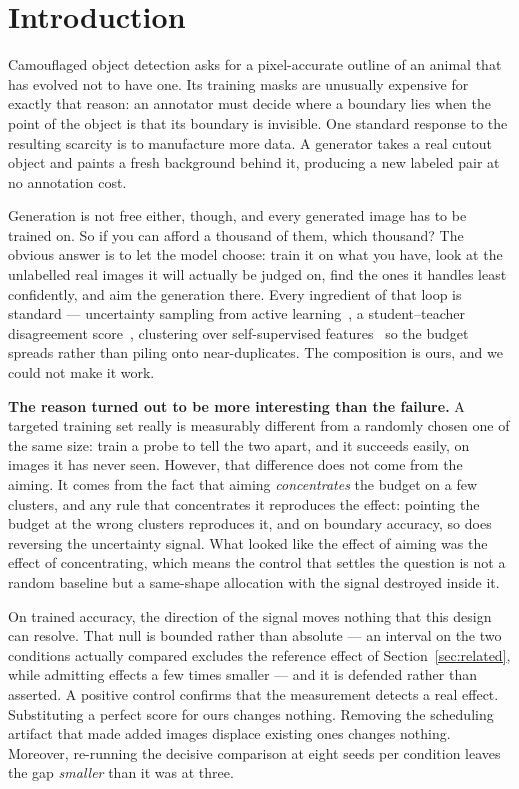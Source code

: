 \documentclass{article}
\begin{document}
\section{Introduction}
\label{sec:intro}
Camouflaged object detection asks for a pixel-accurate outline of an animal that has evolved not to
have one. Its training masks are unusually expensive for exactly that reason: an annotator must
decide where a boundary lies when the point of the object is that its boundary is invisible. One standard response to the resulting scarcity is to manufacture more data. A generator takes a real
cutout object and paints a fresh background behind it, producing a new labeled pair at no
annotation cost.

Generation is not free either, though, and every generated image has to be trained on. So if you can
afford a thousand of them, which thousand? The obvious answer is to let the model choose: train it
on what you have, look at the unlabelled real images it will actually be judged on, find the ones it
handles least confidently, and aim the generation there. Every ingredient of that loop is
standard --- uncertainty sampling from active learning~\citep{settles2009active}, a student--teacher
disagreement score~\citep{tarvainen2017mean}, clustering over self-supervised
features~\citep{oquab2024dinov2} so the budget spreads rather than piling onto near-duplicates. The
composition is ours, and we could not make it work.

\textbf{The reason turned out to be more interesting than the failure.} A targeted training set
really is measurably different from a randomly chosen one of the same size: train a probe to tell the two apart, and it succeeds easily, on images it has never seen. However, that difference does not come
from the aiming. It comes from the fact that aiming \emph{concentrates} the budget on a few
clusters, and any rule that concentrates it reproduces the effect: pointing the budget at the wrong
clusters reproduces it, and on boundary accuracy, so does reversing the uncertainty signal. What
looked like the effect of aiming was the effect of concentrating, which means the control that
settles the question is not a random baseline but a same-shape allocation with the signal destroyed
inside it.

On trained accuracy, the direction of the signal moves nothing that this design can resolve. That null is
bounded rather than absolute --- an interval on the two conditions actually compared excludes the
reference effect of Section~\ref{sec:related}, while admitting effects a few times smaller --- and it is
defended rather than asserted. A positive control confirms that the measurement detects a real effect.
Substituting a perfect score for ours changes nothing. Removing the scheduling artifact that made
added images displace existing ones changes nothing. Moreover, re-running the decisive comparison at eight
seeds per condition leaves the gap \emph{smaller} than it was at three.
\end{document}
